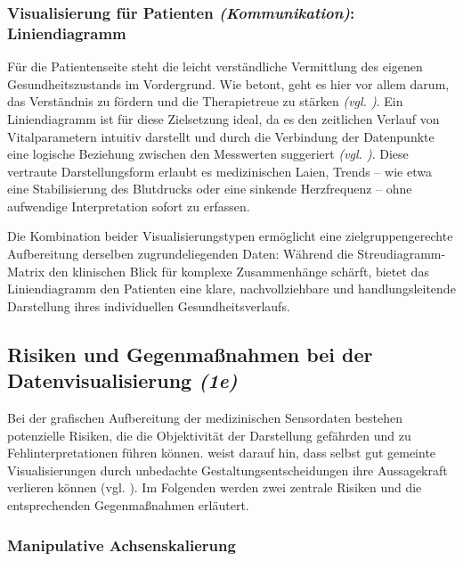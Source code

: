 \subsubsection{Visualisierung für Patienten \textit{(Kommunikation)}: Liniendiagramm}

Für die Patientenseite steht die leicht verständliche Vermittlung des eigenen Gesundheitszustands im Vordergrund. Wie \citeauthor{2} betont, geht es hier vor allem darum, das Verständnis zu fördern und die Therapietreue zu stärken \textit{(\acs{vgl.} \cite[8]{2})}. Ein Liniendiagramm ist für diese Zielsetzung ideal, da es den zeitlichen Verlauf von Vitalparametern intuitiv darstellt und durch die Verbindung der Datenpunkte eine logische Beziehung zwischen den Messwerten suggeriert \textit{(\acs{vgl.} \cite[63]{1})}. Diese vertraute Darstellungsform erlaubt es medizinischen Laien, Trends – wie etwa eine Stabilisierung des Blutdrucks oder eine sinkende Herzfrequenz – ohne aufwendige Interpretation sofort zu erfassen.

Die Kombination beider Visualisierungstypen ermöglicht eine zielgruppengerechte Aufbereitung derselben zugrundeliegenden Daten: Während die Streudiagramm-Matrix den klinischen Blick für komplexe Zusammenhänge schärft, bietet das Liniendiagramm den Patienten eine klare, nachvollziehbare und handlungsleitende Darstellung ihres individuellen Gesundheitsverlaufs.


\subsection{Risiken und Gegenmaßnahmen bei der Datenvisualisierung \textit{(1e)}}
\label{sec:1e}

Bei der grafischen Aufbereitung der medizinischen Sensordaten bestehen potenzielle Risiken, die die Objektivität der Darstellung gefährden und zu Fehlinterpretationen führen können. \citeauthor{2} weist darauf hin, dass selbst gut gemeinte Visualisierungen durch unbedachte Gestaltungsentscheidungen ihre Aussagekraft verlieren können (vgl. \cite[31]{2}). Im Folgenden werden zwei zentrale Risiken und die entsprechenden Gegenmaßnahmen erläutert.

\subsubsection{Manipulative Achsenskalierung}

